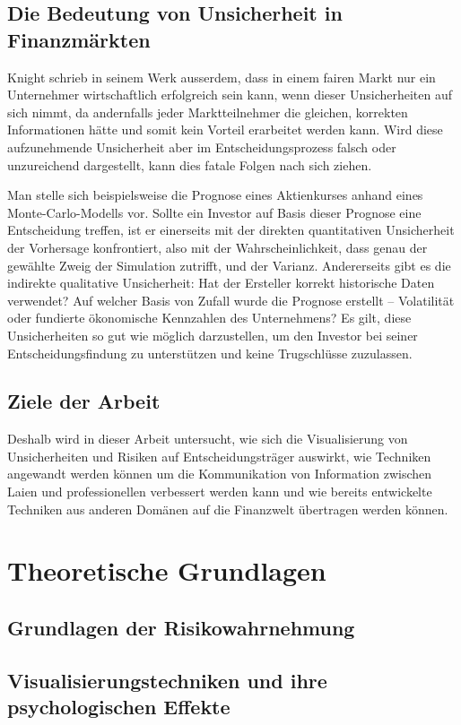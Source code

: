 \subsection{Die Bedeutung von Unsicherheit in Finanzmärkten}
Knight schrieb in seinem Werk ausserdem, dass in einem fairen Markt nur ein Unternehmer wirtschaftlich erfolgreich
sein kann, wenn dieser Unsicherheiten auf sich nimmt, da andernfalls jeder Marktteilnehmer die gleichen, korrekten 
Informationen hätte und somit kein Vorteil erarbeitet werden kann.
Wird diese aufzunehmende Unsicherheit aber im Entscheidungsprozess falsch oder unzureichend dargestellt, kann dies fatale Folgen nach sich 
ziehen. 

Man stelle sich beispielsweise die Prognose eines Aktienkurses anhand eines Monte-Carlo-Modells vor. Sollte ein Investor auf Basis 
dieser Prognose eine Entscheidung treffen, ist er einerseits mit der direkten quantitativen Unsicherheit der Vorhersage konfrontiert, 
also mit der Wahrscheinlichkeit, dass genau der gewählte Zweig der Simulation zutrifft, und der Varianz. Andererseits gibt es die 
indirekte qualitative Unsicherheit: Hat der Ersteller korrekt historische Daten verwendet? \cite{Padilla2021} Auf welcher Basis von Zufall wurde die Prognose erstellt –
 Volatilität oder fundierte ökonomische Kennzahlen des Unternehmens? Es gilt, diese Unsicherheiten so gut wie möglich darzustellen, 
 um den Investor bei seiner Entscheidungsfindung zu unterstützen und keine Trugschlüsse zuzulassen.
\subsection{Ziele der Arbeit}
Deshalb wird in dieser Arbeit untersucht, wie sich die Visualisierung von Unsicherheiten und Risiken auf Entscheidungsträger auswirkt, wie Techniken angewandt werden können um 
die Kommunikation von Information zwischen Laien und professionellen verbessert werden kann und wie bereits entwickelte Techniken aus anderen Domänen auf die Finanzwelt übertragen werden können.


\section{Theoretische Grundlagen}
\subsection{Grundlagen der Risikowahrnehmung}
\cite{Larcher2020}
\subsection{Visualisierungstechniken und ihre psychologischen Effekte}
\cite{Joslyn2021}

